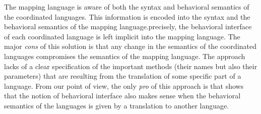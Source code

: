 The mapping language is aware of both the syntax and behavioral semantics of the coordinated languages. This information is encoded into the syntax and the behavioral semantics of the mapping language.precisely, the behavioral interface of each coordinated language is left implicit into the mapping language. The major \emph{cons} of this solution is that any change in the semantics of the coordinated languages compromises the semantics of the mapping language. The approach lacks of a clear specification of the important methods (their names but also their parameters) that are resulting from the translation of some specific part of a language. From our point of view, the only \emph{pro} of this approach is that shows that the notion of behavioral interface also makes sense when the behavioral semantics of the languages is given by a translation to another language.

 
